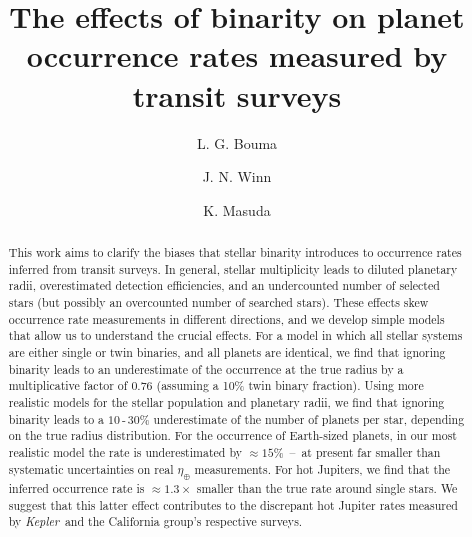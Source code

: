 \documentclass[12pt,modern]{aastex61}
\begin{document}
    
\title{ The effects of binarity on planet occurrence rates measured by transit 
surveys}
%
%
\author{L. G. Bouma}
\author{J. N. Winn}
\author{K. Masuda}
%
%
\begin{abstract}
%
This work aims to clarify the biases that stellar binarity introduces
to occurrence rates inferred from transit surveys.
In general, stellar multiplicity leads to diluted planetary 
radii, overestimated detection efficiencies, and an undercounted number of 
selected stars (but possibly an overcounted number of searched stars).
These effects skew occurrence rate measurements in different directions, and 
we develop simple models that allow us to understand the crucial effects.
For a model in which all stellar systems are either single or twin binaries, 
and all planets are identical, we find that ignoring binarity leads to an 
underestimate of the occurrence at the true radius by a multiplicative factor 
of $0.76$ (assuming a 10\% twin binary fraction).
Using more realistic models for the stellar population and planetary 
radii, we find that ignoring binarity leads to a $10$\,-\,$30\%$ 
underestimate of the number of planets per star, depending on the true radius 
distribution.
For the occurrence of Earth-sized planets, in our most realistic model the 
rate is underestimated by $\approx 15\%$~--~at present far smaller than 
systematic uncertainties on real $\eta_\oplus$ measurements.
For hot Jupiters, we find that the inferred occurrence rate is 
$\approx 1.3\times$ smaller than the true rate around single stars.
We suggest that this latter effect contributes to the discrepant hot Jupiter 
rates measured by {\it Kepler}\ and the California group's respective surveys.
%
\end{abstract}
%
%
%








\end{document}
